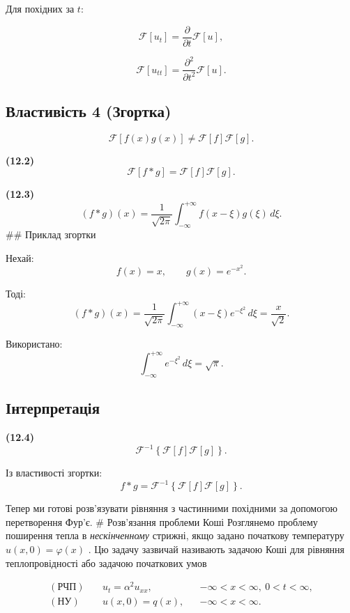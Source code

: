 \documentclass[
  ukrainian,
]{article}
\begin{document}
Для похідних за \(t\):

\[
\mathcal{F}[u_t] = \frac{\partial}{\partial t}\mathcal{F}[u],
\]

\[
\mathcal{F}[u_{tt}] = \frac{\partial^2}{\partial t^2}\mathcal{F}[u].
\]

\subsection{Властивість 4
(Згортка)}\label{ux432ux43bux430ux441ux442ux438ux432ux456ux441ux442ux44c-4-ux437ux433ux43eux440ux442ux43aux430}

\[
\mathcal{F}[f(x)g(x)] \neq \mathcal{F}[f]\mathcal{F}[g].
\]

\textbf{(12.2)} \[
\mathcal{F}[f*g] = \mathcal{F}[f]\mathcal{F}[g].
\]

\textbf{(12.3)} \[
(f*g)(x) = \frac{1}{\sqrt{2\pi}} \int_{-\infty}^{+\infty} f(x-\xi)g(\xi)\,d\xi.
\] \#\# Приклад згортки

Нехай: \[
f(x) = x, \qquad g(x) = e^{-x^2}.
\]

Тоді: \[
(f*g)(x) = \frac{1}{\sqrt{2\pi}} \int_{-\infty}^{+\infty} (x-\xi)e^{-\xi^2}\,d\xi = \frac{x}{\sqrt{2}}.
\]

Використано: \[
\int_{-\infty}^{+\infty} e^{-\xi^2}\,d\xi = \sqrt{\pi}.
\]

\subsection{Інтерпретація}\label{ux456ux43dux442ux435ux440ux43fux440ux435ux442ux430ux446ux456ux44f}

\textbf{(12.4)} \[
\mathcal{F}^{-1}\left\{\mathcal{F}[f]\mathcal{F}[g]\right\}.
\]

Із властивості згортки: \[
f * g = \mathcal{F}^{-1}\left\{\mathcal{F}[f]\mathcal{F}[g]\right\}.
\]

Тепер ми готові розв'язувати рівняння з частинними похідними за
допомогою перетворення Фур'є. \# Розв'язання проблеми Коші Розглянемо
проблему поширення тепла в \emph{нескінченному} стрижні, якщо задано
початкову температуру \(u(x, 0) = \varphi(x)\) . Цю задачу зазвичай
називають задачою Коші для рівняння теплопровідності або задачою
початкових умов

\[
\begin{aligned}
(\text{РЧП})\quad & u_t=\alpha^2u_{xx}, && -\infty<x<\infty,\ 0<t<\infty,\\
(\text{НУ})\quad & u(x,0)=q(x), && -\infty<x<\infty.
\end{aligned}
\]
\end{document}
